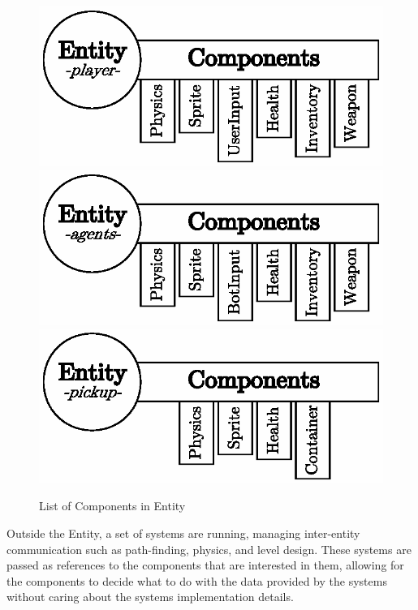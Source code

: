 \documentclass[a4paper, twocolumn]{article}
\begin{document}
        \begin{figure}[H]
            \centering
            \includegraphics[width=0.8\linewidth]{share/player_entity.eps}
            \includegraphics[width=0.8\linewidth]{share/agent_entity.eps}
            \includegraphics[width=0.8\linewidth]{share/pickup_entity.eps}
            \caption{List of Components in Entity}
            \label{fig:entity_component_system}
        \end{figure}

        Outside the Entity, a set of systems are running, managing inter-entity communication such as path-finding, physics, and level design. These systems are passed as references to the components that are interested in them, allowing for the components to decide what to do with the data provided by the systems without caring about the systems implementation details. 

\end{document}
